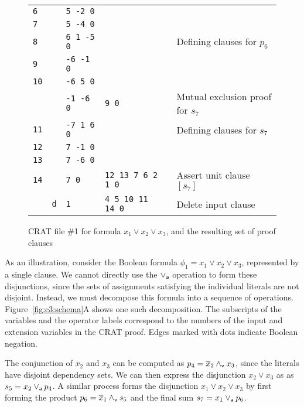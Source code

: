 \documentclass{llncs}
\newcommand{\pand}{\mathbin{\land_{\sf v}}}
\newcommand{\por}{\mathbin{\lor_{\sf a}}}
\newcommand{\obar}[1]{\overline{#1}}
\begin{document}
\begin{figure}
\begin{center}
\begin{tabular}{lcllll}
    {\tt 6} &     & {\tt  5 -2 0}    &  &  \\  %
    {\tt 7} &     & {\tt  5 -4 0}    &  & &  \\  %
    {\tt 8} &     & {\tt 6  1 -5 0}  &    & & Defining clauses for $p_6$ \\ 
    {\tt 9} &     & {\tt -6 -1 0}    &  & &  \\  %
    {\tt 10} &     & {\tt -6 5 0}    &  & &  \\  %
            &     & {\tt -1 -6 0}   & {\tt 9 0}  & &  Mutual exclusion proof for $s_7$ \\
    {\tt 11} &     & {\tt -7 1 6 0}  &  & & Defining clauses for $s_7$ \\ 
    {\tt 12} &     & {\tt  7 -1 0}     & &  \\  %
    {\tt 13} &     & {\tt  7 -6 0}     & &  \\  %
    {\tt 14} &     & {\tt 7 0} & {\tt 12 13 7 6 2 1 0} & & Assert unit clause $[s_7]$ \\
             & {\tt d}  & {\tt 1}  & {\tt 4 5 10 11 14 0} & & Delete input clause \\
  \end{tabular}
  \end{center}
  \caption{CRAT file \#1 for formula $x_1 \lor x_2 \lor x_3$, and the resulting set of proof clauses}
  \label{fig:c3:crat}
\end{figure}
    
As an illustration, consider the Boolean formula
$\phi_1 = x_1 \lor x_2 \lor x_3$,
represented by a single clause.  We cannot directly use the
$\por$ operation to form these disjunctions, since the sets of assignments
satisfying the individual literals are not disjoint.  Instead, we must
decompose this formula into a sequence of operations.
Figure~\ref{fig:c3:schema}A shows one such decomposition.
The subscripts of the variables and the operator labels correspond to
the numbers of the input and extension variables in the CRAT proof.
Edges marked with dots indicate Boolean negation.

The conjunction of $\obar{x}_2$ and $x_3$ can be computed as $p_4 =
\obar{x}_2 \pand x_3$, since the literals have disjoint dependency
sets. We can then express the disjunction $x_2 \lor x_3$ as
as $s_5 = x_2 \por p_4$.  A similar process forms the
disjunction $x_1 \lor x_2 \lor x_3$ by first forming the product $p_6
= \obar{x}_1 \pand s_5$ and the final sum $s_7 = x_1 \por p_6$.
\end{document}

